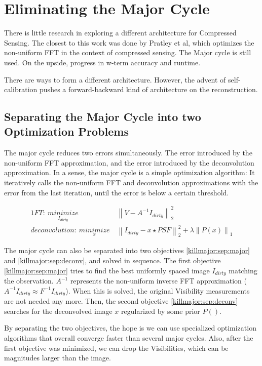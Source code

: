 \section{Eliminating the Major Cycle}\label{killmajor}
There is little research in exploring a different architecture for Compressed Sensing. The closest to this work was done by Pratley et al\cite{pratley2017robust}, which optimizes the non-uniform FFT in the context of compressed sensing. The Major cycle is still used. On the upside, progress in w-term accuracy and runtime. 

There are ways to form a different architecture. However, the advent of self-calibration pushes a forward-backward kind of architecture on the reconstruction. 


\subsection{Separating the Major Cycle into two Optimization Problems}
The major cycle reduces two errors simultaneously. The error introduced by the non-uniform FFT approximation, and the error introduced by the deconvolution approximation. In a sense, the major cycle is a simple optimization algorithm: It iteratively calls the non-uniform FFT and deconvolution approximations with the error from the last iteration, until the error is below a certain threshold.

\begin{alignat}{1}
FT:\: \underset{I_{dirty}}{minimize} \:& \left \|  V - A^{-1}I_{dirty} \right \|_2^2\label{killmajor:sep:major}\\
deconvolution:\: \underset{x}{minimize} \:& \left \| I_{dirty} - x \star PSF \right \|_2^2 + \lambda \left \| P(x) \right \|_1 \label{killmajor:sep:deconv}
\end{alignat}

The major cycle can also be separated into two objectives \eqref{killmajor:sep:major} and \eqref{killmajor:sep:deconv}, and solved in sequence. The first objective \eqref{killmajor:sep:major} tries to find the best uniformly spaced image $I_{dirty}$ matching the observation. $A^{-1}$ represents the non-uniform inverse FFT approximation ($A^{-1}I_{dirty} \approx F^{-1}I_{dirty}$). When this is solved, the original Visibility measurements are not needed any more. Then, the second objective \eqref{killmajor:sep:deconv} searches for the deconvolved image $x$ regularized by some prior $P()$.

By separating the two objectives, the hope is we can use specialized optimization algorithms that overall converge faster than several major cycles. Also, after the first objective was minimized, we can drop the Visibilities, which can be magnitudes larger than the image. 

